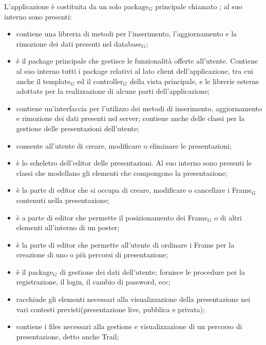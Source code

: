 L'applicazione è costituita da un solo package$_G$ principale chiamato ; al suo interno sono presenti:
\begin{itemize}
\item {} contiene una libreria di metodi per l'inserimento, l'aggiornamento e la rimozione dei dati presenti nel database$_G$;
\item {} è il package principale che gestisce le funzionalità offerte all'utente. Contiene al suo interno tutti i package relativi al lato client dell'applicazione, tra cui anche il template$_G$ ed il controller$_G$ della vista principale, e le librerie esterne adottate per la realizzazione di alcune parti dell'applicazione;
\item {} contiene un'interfaccia per l'utilizzo dei metodi di inserimento, aggiornamento e rimozione dei dati presenti nel server; contiene anche delle classi per la gestione delle presentazioni dell'utente;
\item {} consente all'utente di creare, modificare o eliminare le  presentazioni;
\item {} è lo scheletro dell'editor delle presentazioni. Al suo interno sono presenti le classi che modellano gli elementi che compongono la presentazione;
\item {} è la parte di editor che si occupa di creare, modificare o cancellare i Frame$_G$ contenuti nella presentazione;
\item {} è a parte di editor che permette il posizionamento dei Frame$_G$ o di altri elementi all'interno di un poster;
\item {} è la parte di editor che permette all'utente di ordinare i Frame per la creazione di uno o più percorsi di presentazione;
\item {} è il package$_G$ di gestione dei dati dell'utente; fornisce le procedure per la registrazione, il login, il cambio di password, ecc;
\item {} racchiude gli elementi necessari alla visualizzazione della presentazione nei vari contesti previsti(presentazione live, pubblica e privata);
\item {} contiene i files necessari alla gestione e visualizzazione di un percorso di presentazione, detto anche Trail;
\end{itemize}

\clearpage